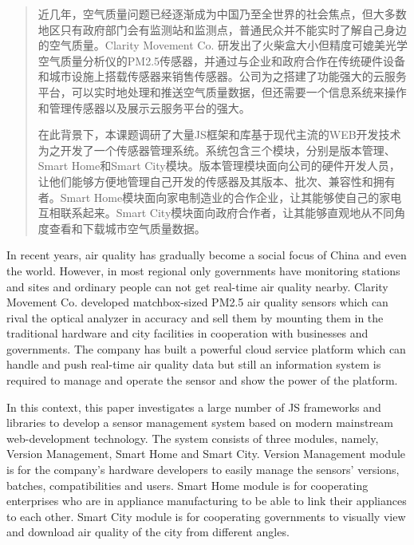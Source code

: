 
\begin{abstract}

近几年，空气质量问题已经逐渐成为中国乃至全世界的社会焦点，但大多数地区只有政府部门会有监测站和监测点，普通民众并不能实时了解自己身边的空气质量。Clarity Movement Co. 研发出了火柴盒大小但精度可媲美光学空气质量分析仪的PM2.5传感器，并通过与企业和政府合作在传统硬件设备和城市设施上搭载传感器来销售传感器。公司为之搭建了功能强大的云服务平台，可以实时地处理和推送空气质量数据，但还需要一个信息系统来操作和管理传感器以及展示云服务平台的强大。

在此背景下，本课题调研了大量JS框架和库基于现代主流的WEB开发技术为之开发了一个传感器管理系统。系统包含三个模块，分别是版本管理、Smart Home和Smart City模块。版本管理模块面向公司的硬件开发人员，让他们能够方便地管理自己开发的传感器及其版本、批次、兼容性和拥有者。Smart Home模块面向家电制造业的合作企业，让其能够使自己的家电互相联系起来。Smart City模块面向政府合作者，让其能够直观地从不同角度查看和下载城市空气质量数据。

\end{abstract}

\begin{englishabstract}

In recent years, air quality has gradually become a social focus of China and even the world. However, in most regional only governments have monitoring stations and sites and ordinary people can not get real-time air quality nearby. Clarity Movement Co. developed matchbox-sized PM2.5 air quality sensors which can rival the optical analyzer in accuracy and sell them by mounting them in the traditional hardware and city facilities in cooperation with businesses and governments. The company has built a powerful cloud service platform which can handle and push real-time air quality data but still an information system is required to manage and operate the sensor and show the power of the platform.

In this context, this paper investigates a large number of JS frameworks and libraries to develop a sensor management system based on modern mainstream web-development technology. The system consists of three modules, namely, Version Management, Smart Home and Smart City. Version Management module is for the company's hardware developers to easily manage the sensors' versions, batches, compatibilities and users. Smart Home module is for cooperating enterprises who are in appliance manufacturing to be able to link their appliances to each other. Smart City module is for cooperating governments to visually view and download air quality of the city from different angles.

\end{englishabstract}

